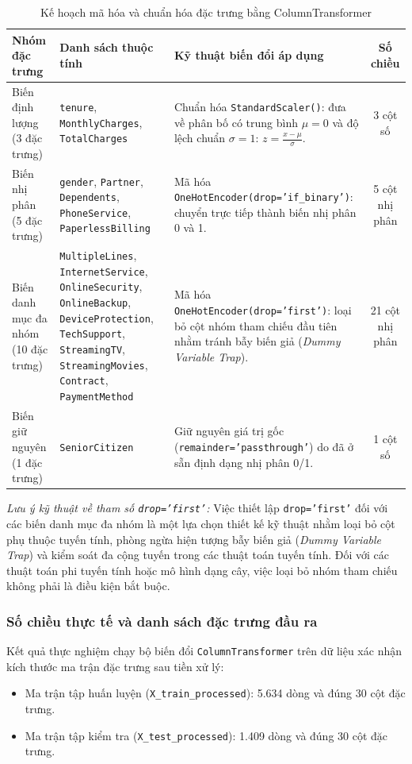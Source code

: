 \documentclass[a4paper]{article}
\begin{document}
{\begin{table}[H]
\centering
\caption{Kế hoạch mã hóa và chuẩn hóa đặc trưng bằng ColumnTransformer}
\label{tab:columntransformer}
\small
\begin{tabularx}{\textwidth}{| >{\raggedright\arraybackslash}p{2.6cm} | >{\raggedright\arraybackslash\sloppy}p{4.2cm} | >{\raggedright\arraybackslash}X | c |}
\hline
\textbf{Nhóm đặc trưng} & \textbf{Danh sách thuộc tính} & \textbf{Kỹ thuật biến đổi áp dụng} & \textbf{Số chiều} \\
\hline
Biến định lượng (3 đặc trưng) & \texttt{tenure}, \texttt{MonthlyCharges}, \texttt{TotalCharges} & Chuẩn hóa \texttt{StandardScaler()}: đưa về phân bố có trung bình $\mu = 0$ và độ lệch chuẩn $\sigma = 1$: $z = \frac{x - \mu}{\sigma}$. & 3 cột số \\
\hline
Biến nhị phân (5 đặc trưng) & \texttt{gender}, \texttt{Partner}, \texttt{Dependents}, \texttt{PhoneService}, \texttt{PaperlessBilling} & Mã hóa \texttt{OneHotEncoder(drop='if\_binary')}: chuyển trực tiếp thành biến nhị phân 0 và 1. & 5 cột nhị phân \\
\hline
Biến danh mục đa nhóm (10 đặc trưng) & \texttt{MultipleLines}, \texttt{InternetService}, \texttt{OnlineSecurity}, \texttt{OnlineBackup}, \newline \texttt{DeviceProtection}, \texttt{TechSupport}, \texttt{StreamingTV}, \newline \texttt{StreamingMovies}, \texttt{Contract}, \texttt{PaymentMethod} & Mã hóa \texttt{OneHotEncoder(drop='first')}: loại bỏ cột nhóm tham chiếu đầu tiên nhằm tránh bẫy biến giả (\textit{Dummy Variable Trap}). & 21 cột nhị phân \\
\hline
Biến giữ nguyên (1 đặc trưng) & \texttt{SeniorCitizen} & Giữ nguyên giá trị gốc (\texttt{remainder='passthrough'}) do đã ở sẵn định dạng nhị phân 0/1. & 1 cột số \\
\hline
\end{tabularx}
\end{table}

\noindent \textit{Lưu ý kỹ thuật về tham số \texttt{drop='first'}:} Việc thiết lập \texttt{drop='first'} đối với các biến danh mục đa nhóm là một lựa chọn thiết kế kỹ thuật nhằm loại bỏ cột phụ thuộc tuyến tính, phòng ngừa hiện tượng bẫy biến giả (\textit{Dummy Variable Trap}) và kiểm soát đa cộng tuyến trong các thuật toán tuyến tính. Đối với các thuật toán phi tuyến tính hoặc mô hình dạng cây, việc loại bỏ nhóm tham chiếu không phải là điều kiện bắt buộc.

\subsubsection{Số chiều thực tế và danh sách đặc trưng đầu ra}
Kết quả thực nghiệm chạy bộ biến đổi \texttt{ColumnTransformer} trên dữ liệu xác nhận kích thước ma trận đặc trưng sau tiền xử lý:
\begin{itemize}
    \item Ma trận tập huấn luyện (\texttt{X\_train\_processed}): 5.634 dòng và đúng 30 cột đặc trưng.
    \item Ma trận tập kiểm tra (\texttt{X\_test\_processed}): 1.409 dòng và đúng 30 cột đặc trưng.
\end{itemize}

}
\end{document}
